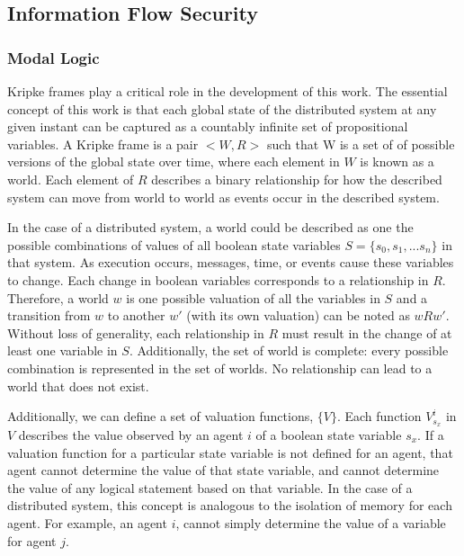 \subsection{Information Flow Security}

\subsubsection{Modal Logic}

Kripke frames\cite{kripke1959}\cite{blackburn2002modal} play a critical role in the development of this work. The essential concept of this work is that each global state of the distributed system at any given instant can be captured as a countably infinite set of propositional variables. A Kripke frame is a pair $<W,R>$\cite{french2006} such that W is a set of of possible versions of the global state over time, where each element in $W$ is known as a world. Each element of $R$ describes a binary relationship for how the described system can move from world to world as events occur in the described system.

In the case of a distributed system, a world could be described as one the possible combinations of values of all boolean state variables $S=\{s_0, s_1, ... s_n\}$ in that system. As execution occurs, messages, time, or events cause these variables to change. Each change in boolean variables corresponds to a relationship in $R$\cite{Gehrke200565}. Therefore, a world $w$ is one possible valuation of all the variables in $S$ and a transition from $w$ to another $w'$ (with its own valuation) can be noted as $wRw'$. Without loss of generality, each relationship in $R$ must result in the change of at least one variable in $S$. Additionally, the set of world is complete: every possible combination is represented in the set of worlds. No relationship can lead to a world that does not exist.

Additionally, we can define a set of valuation functions, $\{V\}$. Each function $V^i_{s_x}$ in $V$ describes the value observed by an agent $i$ of a boolean state variable $s_x$.  If a valuation function for a particular state variable is not defined for an agent, that agent cannot determine the value of that state variable, and cannot determine the value of any logical statement based on that variable. In the case of a distributed system, this concept is analogous to the isolation of memory for each agent. For example, an agent $i$, cannot simply determine the value of a variable for agent $j$.

